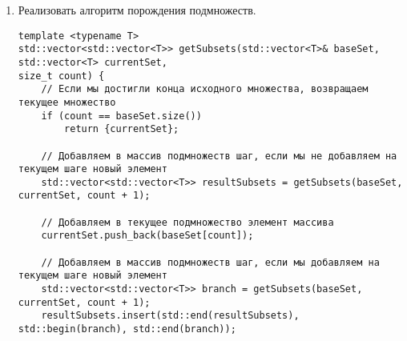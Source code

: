 \documentclass[a4paper,14pt]{extarticle}
\begin{document}
	\begin{enumerate}[№1. ]
		\item Реализовать алгоритм порождения подмножеств.\bigbreak
\begin{verbatim}
template <typename T>
std::vector<std::vector<T>> getSubsets(std::vector<T>& baseSet, std::vector<T> currentSet,
size_t count) {
	// Если мы достигли конца исходного множества, возвращаем текущее множество
	if (count == baseSet.size())
		return {currentSet};
	
	// Добавляем в массив подмножеств шаг, если мы не добавляем на текущем шаге новый элемент
	std::vector<std::vector<T>> resultSubsets = getSubsets(baseSet, currentSet, count + 1);
	
	// Добавляем в текущее подмножество элемент массива
	currentSet.push_back(baseSet[count]);
	
	// Добавляем в массив подмножеств шаг, если мы добавляем на текущем шаге новый элемент
	std::vector<std::vector<T>> branch = getSubsets(baseSet, currentSet, count + 1);
	resultSubsets.insert(std::end(resultSubsets), std::begin(branch), std::end(branch));
	

\end{verbatim}
\end{enumerate}
\end{document}
